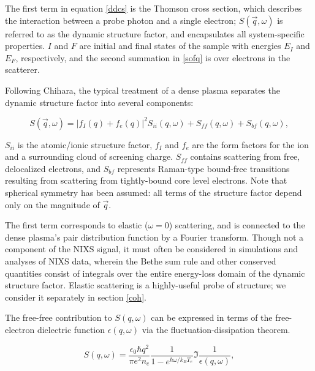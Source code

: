 \documentclass [11pt, proquest, article] {uwthesis}[2016/11/22]
\begin{document}
The first term in equation \ref{ddcs} is the Thomson cross section, which describes the interaction between a probe photon and a single electron; $S(\vec{q}, \omega)$ is referred to as the dynamic structure factor, and encapsulates all system-specific properties. $I$ and $F$ are initial and final states of the sample with energies $E_I$ and $E_F$, respectively, and the second summation in \ref{sofq} is over electrons in the scatterer.

Following Chihara, the typical treatment of a dense plasma separates the dynamic structure factor into several components:

\begin{equation}
S(\vec{q}, \omega) = |f_I(q) + f_e(q)|^2 S_{ii}(q, \omega) + S_{ff}(q, \omega) + S_{bf}(q, \omega),
\end{equation}

$S_{ii}$ is the atomic/ionic structure factor, $f_I$ and $f_e$ are the form factors for the ion and a surrounding cloud of screening charge. \cite{chihara2000interaction} $S_{ff}$ contains scattering from free, delocalized electrons, and $S_{bf}$ represents Raman-type bound-free transitions resulting from scattering from tightly-bound core level electrons. Note that spherical symmetry has been assumed: all terms of the structure factor depend only on the magnitude of $\vec{q}$.

The first term corresponds to elastic ($\omega = 0$) scattering, and is connected to the dense plasma's pair distribution function by a Fourier transform. Though not a component of the NIXS signal, it must often be considered in simulations and analyses of NIXS data, wherein the Bethe sum rule and other conserved quantities consist of integrals over the entire energy-loss domain of the dynamic structure factor. \cite{mattern2013theoretical} Elastic scattering is a highly-useful probe of structure; we consider it separately in section \ref{coh}. 

The free-free contribution to $S(q, \omega)$ can be expressed in terms of the free-electron dielectric function $\epsilon(q, \omega)$  via the fluctuation-dissipation theorem.\cite{kubo1966fluctuation}

\begin{equation}
S(q, \omega) = \frac{\epsilon_0 \hbar q^2}{\pi e^2 n_e} \frac{1}{1 - e^{\hbar \omega/k_B T_e}} \Im\frac{1}{\epsilon(q, \omega)},
\end{equation}
\end{document}
